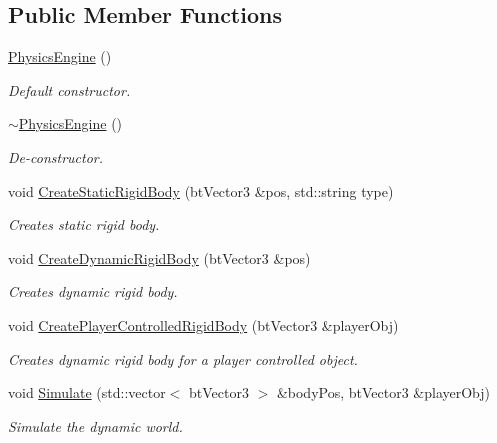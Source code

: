\subsection*{Public Member Functions}
\begin{CompactItemize}
\item 
\hyperlink{class_physics_engine_7fc9180ea453680df0b863fa157c5b92}{PhysicsEngine} ()
\begin{CompactList}\small\item\em Default constructor. \item\end{CompactList}\item 
\hyperlink{class_physics_engine_e5f076ee99bbfdbc79ab2d27366d8476}{$\sim$PhysicsEngine} ()
\begin{CompactList}\small\item\em De-constructor. \item\end{CompactList}\item 
void \hyperlink{class_physics_engine_2f5bb835773d64a6ff21933d5137c427}{CreateStaticRigidBody} (btVector3 \&pos, std::string type)
\begin{CompactList}\small\item\em Creates static rigid body. \item\end{CompactList}\item 
void \hyperlink{class_physics_engine_549c7e9116d06e8f7599497c3c4f6fd1}{CreateDynamicRigidBody} (btVector3 \&pos)
\begin{CompactList}\small\item\em Creates dynamic rigid body. \item\end{CompactList}\item 
void \hyperlink{class_physics_engine_6096d332305e50fba86f377c00ec27e0}{CreatePlayerControlledRigidBody} (btVector3 \&playerObj)
\begin{CompactList}\small\item\em Creates dynamic rigid body for a player controlled object. \item\end{CompactList}\item 
void \hyperlink{class_physics_engine_9d6bec05e95efd4b9168b507a90883b9}{Simulate} (std::vector$<$ btVector3 $>$ \&bodyPos, btVector3 \&playerObj)
\begin{CompactList}\small\item\em Simulate the dynamic world. \item\end{CompactList}\item 

\end{CompactItemize}
